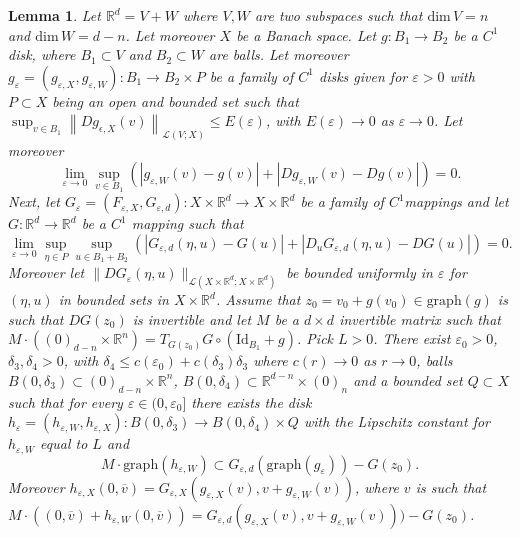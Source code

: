 \documentclass[10pt,a4paper]{amsart}
\newtheorem{lem}{Lemma}
\def\R{\mathbb{R}}
\begin{document}
	 	\begin{lem} \label{lem:transport_eps} Let $\R^d=V+W$ where $V,W$ are two subspaces such that $\text{dim}\, V = n$ and $\text{dim}\, W = d-n$. Let moreover $X$ be a Banach space. Let $g:B_1\to B_2$ be a $C^1$  disk, where $B_1\subset V$ and $B_2 \subset W$ are balls.  Let moreover $g_\varepsilon=(g_{\varepsilon,X},g_{\varepsilon,W}):B_1\to B_2\times P$ be a family of $C^1$  disks given for $\varepsilon>0$ with $P\subset X$ being an open and bounded set such that $\sup_{v\in B_1}\left\|Dg_{\epsilon,X}(v)\right\|_{\mathcal{L}(V;X)} \leq E(\varepsilon)$, with $E(\varepsilon)\to 0$ as $\varepsilon\to 0$. Let moreover 
	 		$$
	 		\lim_{\varepsilon\to 0}\sup_{v\in B_1}\left(|g_{\varepsilon,W}(v)-g(v)|+\left|D g_{\varepsilon,W}(v)-D g(v)\right|\right) = 0.
	 		$$
	 		Next, let $G_\varepsilon=(F_{\varepsilon,X},G_{\varepsilon,d}):X \times \R^d\to X\times \R^d$ be a family of $C^1 $mappings and let $G:\R^d\to \R^d$ be a $C^1$ mapping such that
	 		$$
	 		\lim_{\varepsilon\to 0}\sup_{\eta\in P}\sup_{u\in B_1+B_2}\left(|G_{\varepsilon,d}(\eta,u)-G(u)|+\left|D_uG_{\varepsilon,d}(\eta,u)-DG(u)\right|\right)=0.
	 		$$ Moreover let $\|D G_{\varepsilon}(\eta,u)\|_{\mathcal{L}(X\times \R^d;X\times \R^d)}$ be bounded uniformly in $\varepsilon$ for $(\eta,u)$ in bounded sets in $X\times \R^d$. Assume that $z_0 = v_0+g(v_0) \in \text{graph}(g)$ is such that $DG(z_0)$  is invertible and let $M$ be a $d\times d$  invertible matrix such that $M\cdot((0)_{d-n}\times \R^n) = T_{G(z_0)}G\circ (\textrm{Id}_{B_1}+g)$. Pick $L>0$. There exist $\varepsilon_0>0$, $\delta_3, \delta_4>0$, with $\delta_4\leq c(\varepsilon_0)+c(\delta_3)\delta_3$ where $c(r)\to 0$ as $r\to 0$,  balls $B(0,\delta_3)\subset  (0)_{d-n} \times \R^n$, $B(0,\delta_4)\subset  \R^{d-n} \times (0)_n$ and a bounded set  $Q \subset X$ such that for every $\varepsilon\in (0,\varepsilon_0]$ there exists the  disk $h_\varepsilon=(h_{\varepsilon,W},h_{\varepsilon,X}):B(0,\delta_3)\to B(0,\delta_4)\times Q$ with the Lipschitz constant for $h_{\varepsilon,W}$ equal to $L$ and 
	 		$$
	 		 M \cdot \text{graph}(h_{\varepsilon,W}) \subset G_{\varepsilon,d}(\text{graph}(g_\varepsilon))-G(z_0).
$$
Moreover $h_{\varepsilon,X}(0,\overline{v}) = G_{\varepsilon,X}(g_{\varepsilon,X}(v),v+g_{\varepsilon,W}(v))$, where $v$ is such that $	 		 M \cdot ((0,\overline{v})+h_{\varepsilon,W}(0,\overline{v})) =  G_{\varepsilon,d}(g_{\varepsilon,X}(v),v+g_{\varepsilon,W}(v)))-G(z_0)
$.
	 		\end{lem}
\end{document}
